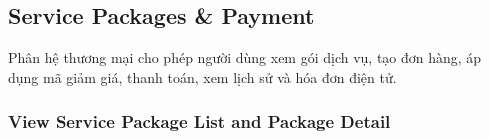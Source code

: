 \documentclass[12pt,a4paper,oneside]{report}
\begin{document}

\subsection{Service Packages \& Payment}
\label{subsec:service-packages-payment}

Phân hệ thương mại cho phép người dùng xem gói dịch vụ, tạo đơn hàng, áp dụng mã giảm giá, thanh toán, xem lịch sử và hóa đơn điện tử.

\subsubsection{View Service Package List and Package Detail}
\label{subsubsec:view-service-packages}
\end{document}
